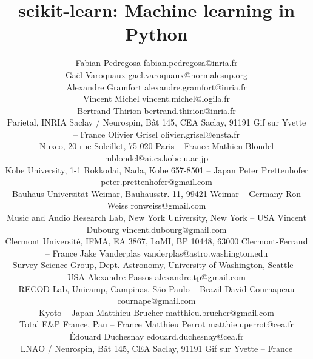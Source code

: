 \documentclass[twoside,11pt]{article}
\begin{document}
\title{scikit-learn: Machine learning in Python}


\author{\name Fabian Pedregosa \email fabian.pedregosa@inria.fr \\
        \name Ga\"el Varoquaux \email gael.varoquaux@normalesup.org  \\
        \name Alexandre Gramfort \email alexandre.gramfort@inria.fr \\
        \name Vincent Michel  \email vincent.michel@logila.fr \\
        \name Bertrand Thirion  \email bertrand.thirion@inria.fr \\
        \addr Parietal, INRIA Saclay / Neurospin,
      B\^at 145, CEA Saclay, 91191 Gif sur Yvette -- {\sc France}
        \AND
        \name Olivier Grisel \email olivier.grisel@ensta.fr \\
        \addr Nuxeo, 20 rue Soleillet, 75 020 Paris -- {\sc France} 
        \AND
        \name Mathieu Blondel \email mblondel@ai.cs.kobe-u.ac.jp \\
        \addr Kobe University, 1-1 Rokkodai, Nada, Kobe 657-8501 -- {\sc Japan}
        \AND
        \name Peter Prettenhofer \email peter.prettenhofer@gmail.com \\
        \addr Bauhaus-Universit\"at Weimar, Bauhausstr. 11, 99421 Weimar -- {\sc Germany}
        \AND
        \name Ron Weiss \email ronweiss@gmail.com \\
        \addr Music and Audio Research Lab, New York University, New York -- {\sc USA}
        \AND
        \name Vincent Dubourg \email vincent.dubourg@gmail.com\\
        \addr Clermont Universit\'e, IFMA, EA 3867, LaMI,
        BP 10448, 63000 Clermont-Ferrand -- {\sc France}
        \AND
        \name Jake Vanderplas \email vanderplas@astro.washington.edu\\
        \addr Survey Science Group, Dept. Astronomy, University of Washington, Seattle -- {\sc USA}
  \AND
        \name Alexandre Passos \email alexandre.tp@gmail.com \\
        \addr RECOD Lab,  Unicamp,  Campinas, S\~ao Paulo -- {\sc Brazil}
        \AND
        \name David Cournapeau \email cournape@gmail.com \\
        \addr Kyoto -- {\sc Japan}
        \AND
        \name Matthieu Brucher \email matthieu.brucher@gmail.com \\
        \addr Total E\&P France,  Pau -- {\sc France}
        \AND
        \name Matthieu Perrot \email matthieu.perrot@cea.fr\\
        \name \'Edouard Duchesnay \email edouard.duchesnay@cea.fr \\
        \addr LNAO / Neurospin,
      B\^at 145, CEA Saclay, 91191 Gif sur Yvette -- {\sc France}
}
\end{document}
